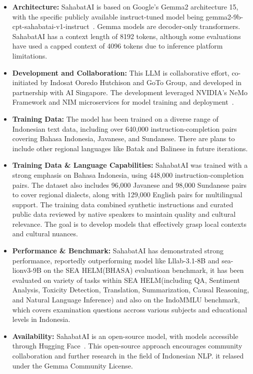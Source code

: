 \documentclass[12pt]{report}
\begin{document}
\begin{itemize}
  \item \textbf{Architecture:} SahabatAI is based on Google's Gemma2 architecture 15, with the specific publicly available instruct-tuned model being gemma2-9b-cpt-sahabatai-v1-instruct~\cite{gemma2_sahabat_ai_v1_instruct}. Gemma models are decoder-only transformers. SahabatAI has a context length of 8192 tokens, although some evaluations have used a capped context of 4096 tokens due to inference platform limitations.
  \item \textbf{Development and Collaboration:} This LLM is collaborative effort, co-initiated by Indosat Ooredo Hutchison and GoTo Group, and developed in partnership with AI Singapore. The development leveraged NVIDIA's NeMo Framework and NIM microservices for model training and deployment~\cite{sahabatAI2024news}.
  \item \textbf{Training Data:} The model has been trained on a diverse range of Indonesian text data, including over 640,000 instruction-completion pairs covering Bahasa Indonesia, Javanese, and Sundanese. There are plans to include other regional languages like Batak and Balinese in future iterations.
  \item \textbf{Training Data \& Language Capabilities:} SahabatAI was trained with a strong emphasis on Bahasa Indonesia, using 448,000 instruction-completion pairs. The dataset also includes 96,000 Javanese and 98,000 Sundanese pairs to cover regional dialects, along with 129,000 English pairs for multilingual support. The training data combined synthetic instructions and curated public data reviewed by native speakers to maintain quality and cultural relevance. The goal is to develop models that effectively grasp local contexts and cultural nuances.
  \item \textbf{Performance \& Benchmark:} SahabatAI has demonstrated strong performance, reportedly outperforming model like Lllab-3.1-8B and sea-lionv3-9B on the SEA HELM(BHASA) evaluatioan benchmark, it has been evaluated on variety of tasks within SEA HELM(including QA, Sentiment Analysis, Toxicity Detection, Translation, Summarization, Causal Reasoning, and Natural Language Inference) and also on the IndoMMLU benchmark, which covers examination questions accross various subjects and educational levels in Indonesia. 
  \item \textbf{Availability:} SahabatAI is an open-source model, with models accessible through Hugging Face~\cite{sahabat_ai}. This open-source approach encourages community collaboration and further research in the field of Indonesian NLP. it relased under the Gemma Community License.

\end{itemize}
\end{document}
